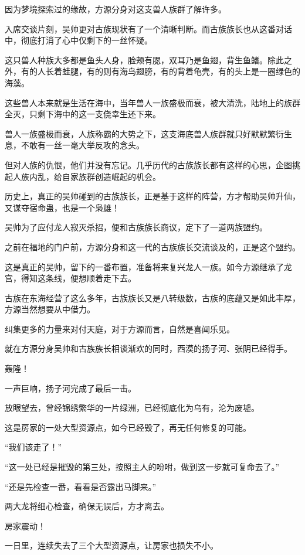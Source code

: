 \begin{this_body}
因为梦境探索过的缘故，方源分身对这支兽人族群了解许多。

入席交谈片刻，吴帅更对古族现状有了一个清晰判断。而古族族长也从这番对话中，彻底打消了心中仅剩下的一丝怀疑。

这只兽人种族大多都是鱼头人身，脸颊有腮，双耳乃是鱼翅，背生鱼鳍。除此之外，有的人长着蛙腿，有的则有海鸟翅膀，有的背着龟壳，有的头上是一圈绿色的海藻。

这些兽人本来就是生活在海中，当年兽人一族盛极而衰，被大清洗，陆地上的族群全灭，只剩下海中的这一支侥幸生还下来。

兽人一族盛极而衰，人族称霸的大势之下，这支海底兽人族群就只好默默繁衍生息，不敢有一丝一毫大举反攻的念头。

但对人族的仇恨，他们并没有忘记。几乎历代的古族族长都有这样的心思，企图挑起人族内乱，给自家族群创造崛起的机会。

历史上，真正的吴帅碰到的古族族长，正是基于这样的阵营，方才帮助吴帅升仙，又谋夺宿命蛊，也是一个枭雄！

吴帅为了应付龙人寂灭杀招，便和古族族长商议，定下了一道两族盟约。

之前在福地的门户前，方源分身和这一代的古族族长交流谈及的，正是这个盟约。

这是真正的吴帅，留下的一番布置，准备将来复兴龙人一族。如今方源继承了龙宫，得知这条线，便想顺着走下去。

古族在东海经营了这么多年，古族族长又是八转级数，古族的底蕴又是如此丰厚，方源当然想要从中借力。

纠集更多的力量来对付天庭，对于方源而言，自然是喜闻乐见。

就在方源分身吴帅和古族族长相谈渐欢的同时，西漠的扬子河、张阴已经得手。

轰隆！

一声巨响，扬子河完成了最后一击。

放眼望去，曾经锦绣繁华的一片绿洲，已经彻底化为乌有，沦为废墟。

这是房家的一处大型资源点，如今已经毁了，再无任何修复的可能。

“我们该走了！”

“这一处已经是摧毁的第三处，按照主人的吩咐，做到这一步就可复命去了。”

“还是先检查一番，看看是否露出马脚来。”

两大龙将细心检查，确保无误后，方才离去。

房家震动！

一日里，连续失去了三个大型资源点，让房家也损失不小。


\end{this_body}
